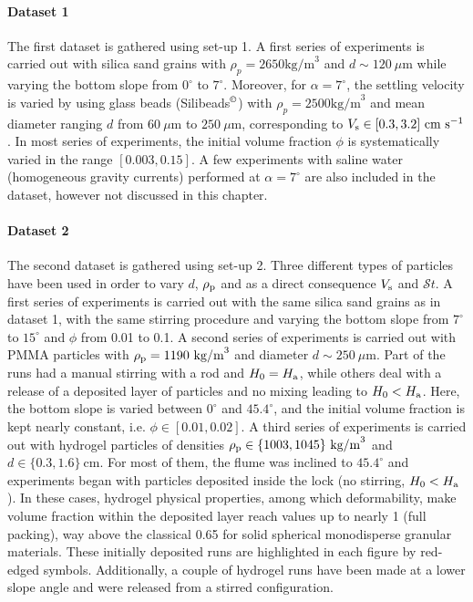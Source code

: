 \documentclass[12pt]{article}
\begin{document}
\paragraph{Dataset 1}

The first dataset is gathered using set-up 1. A first series of experiments is carried out with silica sand grains with $\rho_p=2650\textrm{kg/m}^{3}$ and $d \sim 120~\mu\textrm{m}$ while varying the bottom slope from $0^\circ$ to $7^\circ$. Moreover, for $\alpha = 7^\circ$, the settling velocity is varied by using glass beads (Silibeads$^\copyright$) with $\rho_p=2500\textrm{kg/m}^{3}$ and mean diameter ranging $d$ from $60~\mu\textrm{m}$ to $250~\mu\textrm{m}$, corresponding to $V_{\text s} \in [0.3, 3.2]~\textrm{cm}~\textrm{s}^{-1}$. In most series of experiments, the initial volume fraction $\phi$  is systematically varied in the range $[0.003, 0.15]$.
%
A few experiments with saline water (homogeneous gravity currents) performed at $\alpha=7^\circ$ are also included in the dataset, however not discussed in this chapter.

\paragraph{Dataset 2}

The second dataset is gathered using set-up 2. Three different types of particles have been used in order to vary $d$, $\rho_{\text p}$ and as a direct consequence $V_{\text s}$ and $\mathcal{S}t$. A first series of experiments is carried out with the same silica sand grains as in dataset 1, with the same stirring procedure and varying the bottom slope from $7^\circ$ to $15^\circ$ and $\phi$ from 0.01 to 0.1.
%
A second series of experiments is carried out with PMMA particles with $\rho_{\text p}=1190~\textrm{kg/m}^{3}$ and diameter $d\sim 250~\mu\textrm{m}$. Part of the runs had a manual stirring with a rod and $H_0=H_{\text a}$, while others deal with a release of a deposited layer of particles and no mixing leading to $H_0<H_{\text a}$. Here, the bottom slope is varied between $0^\circ$ and $45.4^\circ$, and the initial volume fraction is kept nearly constant, i.e. $\phi \in [0.01, 0.02]$.
%
A third series of experiments is carried out with hydrogel particles of densities $\rho_{\text p}\in \{1003, 1045\}~\textrm{kg/m}^{3}$ and $d\in \{0.3, 1.6\}~\textrm{cm}$. For most of them, the flume was inclined to $45.4^\circ$ and experiments began with particles deposited inside the lock (no stirring, $H_0<H_{\text a}$). In these cases, hydrogel physical properties, among which deformability, make volume fraction within the deposited layer reach values up to nearly 1 (full packing), way above the classical 0.65 for solid spherical monodisperse granular materials. These initially deposited runs are highlighted in each figure by red-edged symbols. Additionally, a couple of hydrogel runs have been made at a lower slope angle and were released from a stirred configuration.
\end{document}
